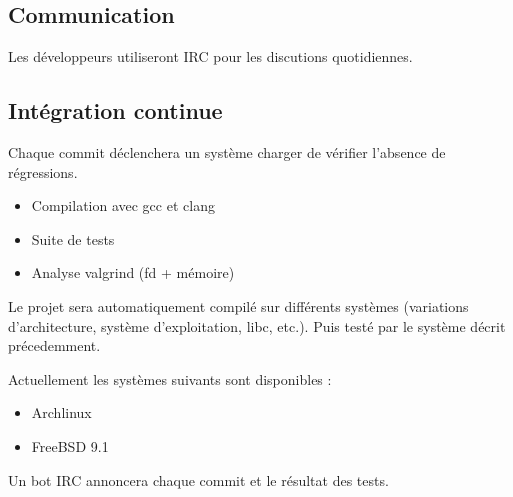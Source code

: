 \subsection{Communication}

Les développeurs utiliseront IRC pour les discutions quotidiennes.

\subsection{Intégration continue}

Chaque commit déclenchera un système charger de vérifier l'absence de
régressions.
\begin{itemize}
    \item Compilation avec gcc et clang
    \item Suite de tests
    \item Analyse valgrind (fd + mémoire)
\end{itemize}

Le projet sera automatiquement compilé sur différents systèmes
(variations d'architecture, système d'exploitation, libc, etc.). Puis testé
par le système décrit précedemment.

Actuellement les systèmes suivants sont disponibles :
\begin{itemize}
    \item Archlinux
    \item FreeBSD 9.1
\end{itemize}

Un bot IRC annoncera chaque commit et le résultat des tests.
